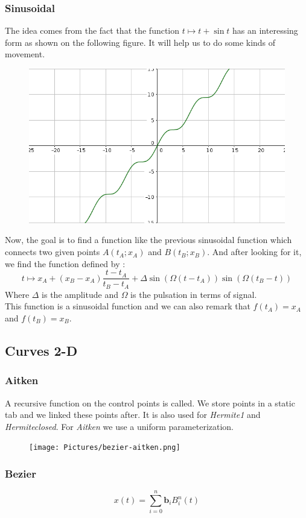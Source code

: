 \documentclass{article}
\begin{document}
\subsubsection*{Sinusoidal}
The idea comes from the fact that the function $t \longmapsto t+\sin t$ has an interessing form as shown
on the following figure. It will help us to do some kinds of movement.
\begin{figure}[H]
	\center
   \includegraphics[scale = 0.35]{Pictures/sin1.png}
\end{figure}
Now, the goal is to find a function like the previous sinusoidal function which connects two given points
$A(t_A;x_A)$ and $B(t_B;x_B)$.
And after looking for it, we find the function defined by :
\[
	t \longmapsto x_A + (x_B-x_A)\frac{t-t_A}{t_B-t_A} + \Delta\sin(\Omega(t-t_A))\sin(\Omega(t_B-t))
\]
Where $\Delta$ is the amplitude and $\Omega$ is the pulsation in terms of signal.\\
This function is a sinusoidal function and we can also remark that $f(t_A)=x_A$ and $f(t_B)=x_B$.
\subsection*{Curves 2-D}
\subsubsection*{Aitken}
 A recursive function on the control points is called. We store points in a static tab and we linked these points after. It is also used for \textit{Hermite1} and \textit{Hermiteclosed}. For \textit{Aitken} we use a uniform parameterization. 
\begin{figure}[H]
   \texttt{[image: Pictures/bezier-aitken.png]}
\end{figure}
\subsubsection*{Bezier}
\begin{equation*}
    x(t) = \sum_{i=0}^n\textbf{b}_i B_i^n(t)
\end{equation*}
\end{document}
